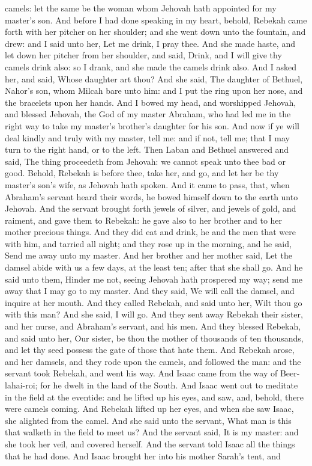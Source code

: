 camels: let the same be the woman whom Jehovah hath appointed for my master’s son. And before I had done speaking in my heart, behold, Rebekah came forth with her pitcher on her shoulder; and she went down unto the fountain, and drew: and I said unto her, Let me drink, I pray thee. And she made haste, and let down her pitcher from her shoulder, and said, Drink, and I will give thy camels drink also: so I drank, and she made the camels drink also. And I asked her, and said, Whose daughter art thou? And she said, The daughter of Bethuel, Nahor’s son, whom Milcah bare unto him: and I put the ring upon her nose, and the bracelets upon her hands. And I bowed my head, and worshipped Jehovah, and blessed Jehovah, the God of my master Abraham, who had led me in the right way to take my master’s brother’s daughter for his son. And now if ye will deal kindly and truly with my master, tell me: and if not, tell me; that I may turn to the right hand, or to the left.  Then Laban and Bethuel answered and said, The thing proceedeth from Jehovah: we cannot speak unto thee bad or good. Behold, Rebekah is before thee, take her, and go, and let her be thy master’s son’s wife, as Jehovah hath spoken. And it came to pass, that, when Abraham’s servant heard their words, he bowed himself down to the earth unto Jehovah. And the servant brought forth jewels of silver, and jewels of gold, and raiment, and gave them to Rebekah: he gave also to her brother and to her mother precious things. And they did eat and drink, he and the men that were with him, and tarried all night; and they rose up in the morning, and he said, Send me away unto my master. And her brother and her mother said, Let the damsel abide with us a few days, at the least ten; after that she shall go. And he said unto them, Hinder me not, seeing Jehovah hath prospered my way; send me away that I may go to my master. And they said, We will call the damsel, and inquire at her mouth. And they called Rebekah, and said unto her, Wilt thou go with this man? And she said, I will go. And they sent away Rebekah their sister, and her nurse, and Abraham’s servant, and his men. And they blessed Rebekah, and said unto her, Our sister, be thou the mother of thousands of ten thousands, and let thy seed possess the gate of those that hate them.  And Rebekah arose, and her damsels, and they rode upon the camels, and followed the man: and the servant took Rebekah, and went his way. And Isaac came from the way of Beer-lahai-roi; for he dwelt in the land of the South. And Isaac went out to meditate in the field at the eventide: and he lifted up his eyes, and saw, and, behold, there were camels coming. And Rebekah lifted up her eyes, and when she saw Isaac, she alighted from the camel. And she said unto the servant, What man is this that walketh in the field to meet us? And the servant said, It is my master: and she took her veil, and covered herself. And the servant told Isaac all the things that he had done. And Isaac brought her into his mother Sarah’s tent, and 